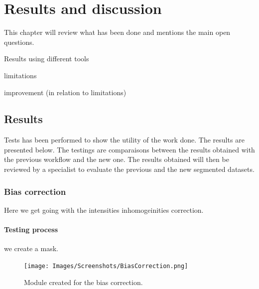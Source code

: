 \chapter{Results and discussion}\label{sec:results}
This chapter will review what has been done and
mentions the main open questions.
\par
Results using different tools
\par
limitations
\par
improvement (in relation to limitations)
%
\section{Results}
%
Tests has been performed to show the utility of the work done. The results are presented below. The testings are comparaisons between the results obtained with the previous workflow and the new one. The results obtained will then be reviewed by a specialist to evaluate the previous and the new segmented datasets.
%
\subsection{Bias correction}
%
Here we get going with the intensities inhomogeinities correction.
%
\subsubsection{Testing process}
%
we create a mask.
%
\begin{figure}\centering
\texttt{[image: Images/Screenshots/BiasCorrection.png]}
  \caption{Module created for the bias correction.%
  }\label{fig:BiasCorrection}
\end{figure}

%
